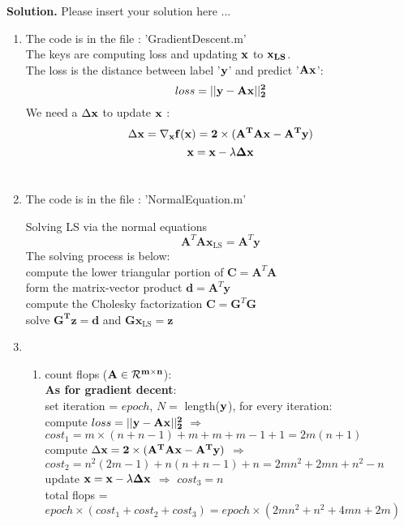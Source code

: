 \documentclass[english,onecolumn]{IEEEtran}
\begin{document}
\newpage

\textbf{Solution.}
Please insert your solution here ...\\

\begin{enumerate}
    \item 
    The code is in the file : 'GradientDescent.m' \\
    The keys are computing loss and updating $\bf{x}$ to $\bf{x_{LS}}$. \\ The loss is the distance between label '$\bf{y}$' and predict '$\bf{Ax}$':
    $$loss = ||\bf{y - Ax} ||^2_2$$
    We need a $\Delta \bf{x}$ to update $\bf{x}$ :
    $$\Delta \bf{x} = \nabla_x f(x) = 2 \times (\bf{A^{T} A x - A^T y}) $$ 
    $$ \bf{x} = \bf{x} - \lambda \Delta \bf{x}  $$ \\
    
    \item
    The code is in the file : 'NormalEquation.m'
    
    Solving LS via the normal equations
    $$ \mathbf{A}^{T} \mathbf{A} \mathbf{x}_{\mathrm{L} \mathrm{S}}=\mathbf{A}^{T} \mathbf{y} $$
    The solving process is below:\\
    compute the lower triangular portion of $\mathbf{C}=\mathbf{A}^{T} \mathbf{A}$\\
    form the matrix-vector product $\mathbf{d}=\mathbf{A}^{T} \mathbf{y}$\\
    compute the Cholesky factorization $\mathbf{C}=\mathbf{G}^{T} \mathbf{G}$\\
    solve $\mathbf{G^{T} z}=\mathbf{d}$ and $\mathbf{G} \mathbf{x}_{\mathrm{LS}}=\mathbf{z}$\\
    
    
    \item
    
    \begin{enumerate}
        \item
        count flops ($\bf{A} \in \mathcal{R}^{\bf{m} \times \bf{n}}$):\\
        \textbf{As for gradient decent}:\\
        set iteration = $epoch$, $N = $ length($\bf{y}$), for every iteration:\\
        compute $loss = ||\bf{y - Ax} ||^2_2 $ $ \Rightarrow $ $cost_1 = m \times (n+n-1)+m+m+m-1+1 = 2m(n+1)$ \\
        compute $\Delta \bf{x} =  2 \times (\bf{A^{T} A x - A^T y})$ $\Rightarrow$ $cost_2=n^2 (2m-1)+n(n+n-1)+n = 2m n^2+2m n +n^2-n$ \\ 
        update $\bf{x} = \bf{x} - \lambda \Delta \bf{x}$ $\Rightarrow$ $cost_3=n$ \\
        total flops = $epoch \times (cost_1 + cost_2 + cost_3) = epoch \times (2m n^2 + n^2 + 4m n +2m )$
        

\end{enumerate}
\end{enumerate}
\end{document}
